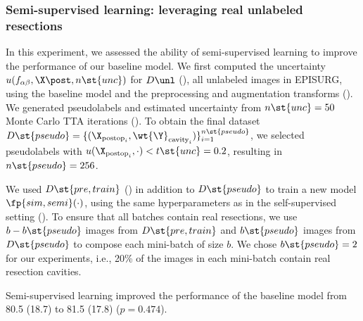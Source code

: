 \subsubsection{Semi-supervised learning: leveraging real unlabeled resections}
\label{sec:results_semi}

\newcommand{\pseudo}{\st{pseudo}}

In this experiment, we assessed the ability of semi-supervised learning to improve the performance of our baseline model.
We first computed the uncertainty $u(f_{\alpha\beta}, \X\post, n\st{unc})$ for
$D\unl$ (),
all unlabeled images in EPISURG,
using the baseline model and the preprocessing and augmentation transforms ().
We generated pseudolabels and estimated uncertainty from $n\st{unc} = 50$ Monte Carlo \ac{TTA} iterations ().
To obtain the final dataset $D\pseudo = \{ (\X_{\text{postop}_i}, \wt{\Y}_{\text{cavity}_i}) \}_{i = 1}^{n\pseudo}$, we selected pseudolabels with $u(\X_{\text{postop}_i}, \cdot) < t\st{unc} = 0.2$, resulting in $n\pseudo = 256$.

We used $D\st{pre,train}$ () in addition to $D\pseudo$ to train a new model $\fp{sim,semi}(\cdot)$, using the same hyperparameters as in the self-supervised setting ().
To ensure that all batches contain real resections, we use $b - b\pseudo$ images from $D\st{pre,train}$ and $b\pseudo$ images from $D\pseudo$ to compose each mini-batch of size $b$.
We chose $b\pseudo = 2$ for our experiments, i.e., 20\% of the images in each mini-batch contain real resection cavities.

Semi-supervised learning improved the performance of the baseline model from 80.5 (18.7) to 81.5 (17.8) ($p = 0.474$).  %

